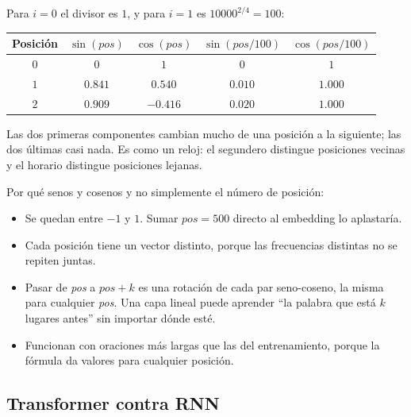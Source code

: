\documentclass[11pt,letterpaper]{article}
\begin{document}
\begin{ejemplo}[Las tres primeras posiciones con $d = 4$]
    Para $i = 0$ el divisor es $1$, y para $i = 1$ es
    $10000^{2/4} = 100$:
    \begin{center}
    \begin{tabular}{ccccc}
        \toprule
        \textbf{Posición} & $\sin(\textit{pos})$ & $\cos(\textit{pos})$
        & $\sin(\textit{pos}/100)$ & $\cos(\textit{pos}/100)$ \\
        \midrule
        $0$ & $0$     & $1$      & $0$     & $1$ \\
        $1$ & $0.841$ & $0.540$  & $0.010$ & $1.000$ \\
        $2$ & $0.909$ & $-0.416$ & $0.020$ & $1.000$ \\
        \bottomrule
    \end{tabular}
    \end{center}
    Las dos primeras componentes cambian mucho de una posición a la
    siguiente; las dos últimas casi nada. Es como un reloj: el
    segundero distingue posiciones vecinas y el horario distingue
    posiciones lejanas.
\end{ejemplo}

\begin{idea}
    Por qué senos y cosenos y no simplemente el número de posición:
    \begin{itemize}[itemsep=0.2em]
        \item Se quedan entre $-1$ y $1$. Sumar $\textit{pos} = 500$
              directo al embedding lo aplastaría.
        \item Cada posición tiene un vector distinto, porque las
              frecuencias distintas no se repiten juntas.
        \item Pasar de \textit{pos} a $\textit{pos} + k$ es una
              rotación de cada par seno-coseno, la misma para
              cualquier \textit{pos}. Una capa lineal puede aprender
              ``la palabra que está $k$ lugares antes'' sin importar
              dónde esté.
        \item Funcionan con oraciones más largas que las del
              entrenamiento, porque la fórmula da valores para
              cualquier posición.
    \end{itemize}
\end{idea}


\subsection*{Transformer contra RNN}
\end{document}
